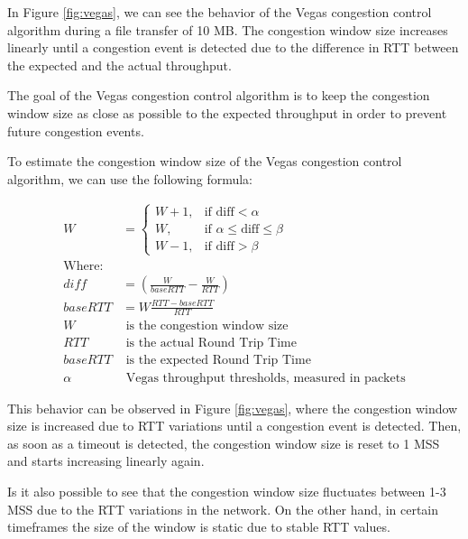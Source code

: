 \documentclass[a4paper, 11pt]{article}
\begin{document}
In Figure \ref{fig:vegas}, we can see the behavior of the Vegas congestion control algorithm during a file transfer of 10 MB. The congestion window size increases linearly until a congestion event is detected due to the difference in RTT between the expected and the actual throughput.

The goal of the Vegas congestion control algorithm is to keep the congestion window size as close as possible to the expected throughput in order to prevent future congestion events.

To estimate the congestion window size of the Vegas congestion control algorithm, we can use the following formula: \cite{uni:vegas}

\begin{equation*}
	\begin{aligned}
		W             & = \begin{cases}
			                  W + 1, & \text{if } \text{diff} < \alpha               \\
			                  W,     & \text{if } \alpha \leq \text{diff} \leq \beta \\
			                  W - 1, & \text{if } \text{diff} > \beta
		                  \end{cases} \\
		\text{Where:} &                                                          \\
		diff          & = ( \frac{W}{baseRTT} - \frac{W}{RTT} )                  \\
		baseRTT       & = W \frac{RTT - baseRTT}{RTT}                            \\
		W             & \text{ is the congestion window size}                    \\
		RTT           & \text{ is the actual Round Trip Time}                    \\
		baseRTT       & \text{ is the expected Round Trip Time}                  \\
		\alpha        & \text{ Vegas throughput thresholds, measured in
			packets}
	\end{aligned}
\end{equation*}

This behavior can be observed in Figure \ref{fig:vegas}, where the congestion window size is increased due to RTT variations until a congestion event is detected. Then, as soon as a timeout is detected, the congestion window size is reset to 1 MSS and starts increasing linearly again.

Is it also possible to see that the congestion window size fluctuates between 1-3 MSS due to the RTT variations in the network. On the other hand, in certain timeframes the size of the window is static due to stable RTT values.
\end{document}

